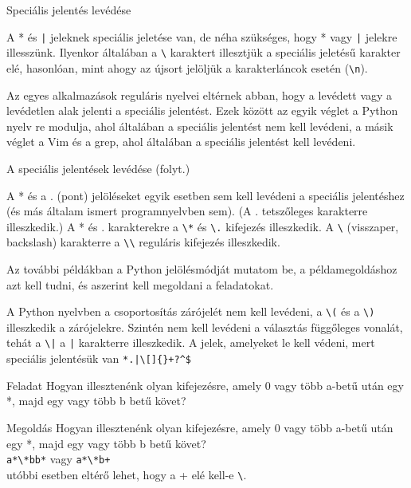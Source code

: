 \documentclass[
    ignorenonframetext
    ]{beamer}
\begin{document}
\begin{frame}[fragile]
    {Speciális jelentés levédése}

    A * és \verb"|" jeleknek speciális jeletése van, de néha szükséges, hogy *
    vagy \verb"|" jelekre illesszünk. Ilyenkor általában a \verb"\" karaktert
    illesztjük a speciális jeletésű karakter elé, hasonlóan, mint ahogy
    az újsort jelöljük a karakterláncok esetén (\verb!\n!).

    Az egyes alkalmazások reguláris nyelvei eltérnek abban, hogy a
    levédett vagy a levédetlen alak jelenti a speciális jelentést. Ezek
    között az egyik véglet a Python nyelv re modulja, ahol általában a
    speciális jelentést nem kell levédeni, a másik véglet a Vim és a
    grep, ahol általában a speciális jelentést kell levédeni.
\end{frame}

\begin{frame}[fragile]
    {A speciális jelentések levédése (folyt.)}


    A * és a . (pont) jelöléseket egyik esetben sem kell levédeni a
    speciális jelentéshez (és más általam ismert programnyelvben sem).
    (A .  tetszőleges karakterre illeszkedik.)  A * és . karakterekre a
    \verb"\*" és \verb"\." kifejezés illeszkedik. A \verb"\" (visszaper,
    backslash) karakterre a \verb"\\" reguláris kifejezés illeszkedik.

    Az további példákban a Python jelölésmódját mutatom be, a
    példamegoldáshoz azt kell tudni, és aszerint kell megoldani a
    feladatokat.

    A Python nyelvben a csoportosítás zárójelét nem kell levédeni, a
    \verb"\(" és a \verb"\)" illeszkedik a zárójelekre. Szintén nem kell
    levédeni a választás függőleges vonalát, tehát a \verb"\|"
    a \verb"|" karakterre illeszkedik. A jelek, amelyeket le
    kell védeni, mert speciális jelentésük van \verb"*.|\[]{}+?^$"
\end{frame}

\begin{frame}[fragile]
    {Feladat}
    Hogyan illesztenénk olyan kifejezésre, amely 0 vagy több a-betű után
    egy *, majd egy vagy több b betű követ?

    \megoldasjon
\end{frame}

\begin{frame}[fragile]
    {Megoldás}
    Hogyan illesztenénk olyan kifejezésre, amely 0 vagy több a-betű után
    egy *, majd egy vagy több b betű követ?\\
    \verb!a*\*bb*! \quad vagy \quad \verb!a*\*b+!\\
    utóbbi esetben eltérő lehet, hogy a + elé kell-e \verb|\|.
\end{frame}
\end{document}
